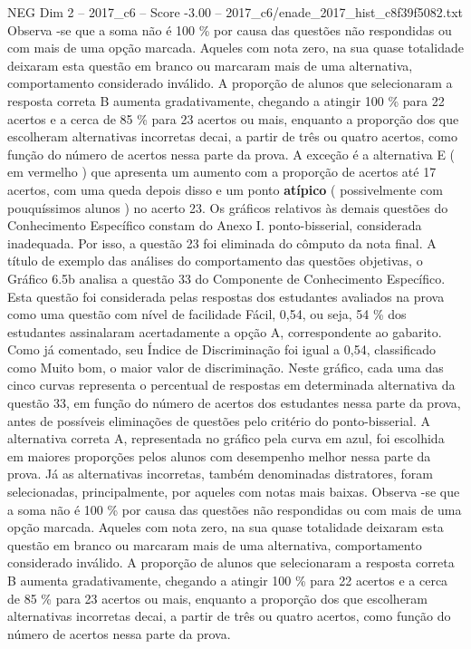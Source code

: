 \begin{textsample}{NEG Dim 2 – 2017\_c6 – Score -3.00 – 2017\_c6/enade\_2017\_hist\_c8f39f5082.txt}
Observa -se que a soma não é 100 \% por causa das questões não respondidas ou com mais de uma opção marcada.
Aqueles com nota zero, na sua quase totalidade deixaram esta questão em branco ou marcaram mais de uma alternativa, comportamento considerado inválido.
A proporção de alunos que selecionaram a resposta correta B aumenta gradativamente, chegando a atingir 100 \% para 22 acertos e a cerca de 85 \% para 23 acertos ou mais, enquanto a proporção dos que escolheram alternativas incorretas decai, a partir de três ou quatro acertos, como função do número de acertos nessa parte da prova.
A exceção é a alternativa E ( em vermelho ) que apresenta um aumento com a proporção de acertos até 17 acertos, com uma queda depois disso e um ponto \textbf{atípico} ( possivelmente com pouquíssimos alunos ) no acerto 23.
Os gráficos relativos às demais questões do Conhecimento Específico constam do Anexo I. ponto-bisserial, considerada inadequada.
Por isso, a questão 23 foi eliminada do cômputo da nota final.
A título de exemplo das análises do comportamento das questões objetivas, o Gráfico 6.5b analisa a questão 33 do Componente de Conhecimento Específico.
Esta questão foi considerada pelas respostas dos estudantes avaliados na prova como uma questão com nível de facilidade Fácil, 0,54, ou seja, 54 \% dos estudantes assinalaram acertadamente a opção A, correspondente ao gabarito.
Como já comentado, seu Índice de Discriminação foi igual a 0,54, classificado como Muito bom, o maior valor de discriminação.
Neste gráfico, cada uma das cinco curvas representa o percentual de respostas em determinada alternativa da questão 33, em função do número de acertos dos estudantes nessa parte da prova, antes de possíveis eliminações de questões pelo critério do ponto-bisserial.
A alternativa correta A, representada no gráfico pela curva em azul, foi escolhida em maiores proporções pelos alunos com desempenho melhor nessa parte da prova.
Já as alternativas incorretas, também denominadas distratores, foram selecionadas, principalmente, por aqueles com notas mais baixas.
Observa -se que a soma não é 100 \% por causa das questões não respondidas ou com mais de uma opção marcada.
Aqueles com nota zero, na sua quase totalidade deixaram esta questão em branco ou marcaram mais de uma alternativa, comportamento considerado inválido.
A proporção de alunos que selecionaram a resposta correta B aumenta gradativamente, chegando a atingir 100 \% para 22 acertos e a cerca de 85 \% para 23 acertos ou mais, enquanto a proporção dos que escolheram alternativas incorretas decai, a partir de três ou quatro acertos, como função do número de acertos nessa parte da prova.

\end{textsample}
